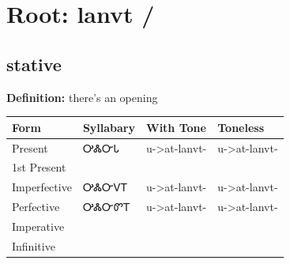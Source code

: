 \documentclass{article}%
\begin{document}
%
\normalsize%
\section*{Root: lanvt / }%
\subsection*{stative}%
\textbf{Definition: }%
there’s an opening%
\\[0.5em]%
\begin{tabular}{|l|l|l|l|}%
\hline%
\textbf{Form}&\textbf{Syllabary}&\textbf{With Tone}&\textbf{Toneless}\\%
\hline%
Present&ᎤᏜᏅᏓ&u{-}>at{-}lanvt{-}&u{-}>at{-}lanvt{-}\\%
1st Present&&&\\%
Imperfective&ᎤᏜᏅᏙᎢ&u{-}>at{-}lanvt{-}&u{-}>at{-}lanvt{-}\\%
Perfective&ᎤᏜᏅᏛᎢ&u{-}>at{-}lanvt{-}&u{-}>at{-}lanvt{-}\\%
Imperative&&&\\%
Infinitive&&&\\%
\hline%
\end{tabular}%
\\[1em]%
\end{document}
